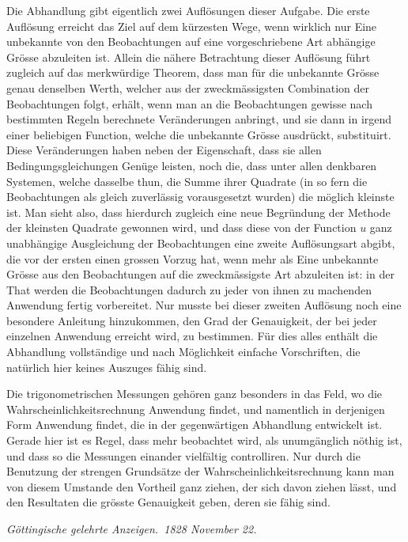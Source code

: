 \documentclass[12pt,a4paper]{article}
\begin{document}
Die Abhandlung gibt eigentlich zwei Aufl\"osungen dieser Aufgabe. Die erste Aufl\"osung erreicht das Ziel auf dem k\"urzesten Wege, wenn wirklich nur Eine unbekannte von den Beobachtungen auf eine vorgeschriebene Art abh\"angige Gr\"osse abzuleiten ist. Allein die n\"ahere Betrachtung dieser Aufl\"osung f\"uhrt zugleich auf das merkw\"urdige Theorem, dass man f\"ur die unbekannte Gr\"osse genau denselben Werth, welcher aus der zweckm\"assigsten Combination der Beobachtungen folgt, erh\"alt, wenn man an die Beobachtungen gewisse nach bestimmten Regeln berechnete Ver\"anderungen anbringt, und sie dann in irgend einer beliebigen Function, welche die unbekannte Gr\"osse ausdr\"uckt, substituirt. Diese Ver\"anderungen haben neben der Eigenschaft, dass sie allen Bedingungsgleichungen Gen\"uge leisten, noch die, dass unter allen denkbaren Systemen, welche dasselbe thun, die Summe ihrer Quadrate (in so fern die Beobachtungen als gleich zuverl\"assig vorausgesetzt wurden) die m\"oglich kleinste ist. Man sieht also, dass hierdurch zugleich eine neue Begr\"undung der Methode der kleinsten Quadrate gewonnen wird, und dass diese von der Function $u$ ganz unabh\"angige Ausgleichung der Beobachtungen eine zweite Aufl\"osungsart abgibt, die vor der ersten einen grossen Vorzug hat, wenn mehr als Eine unbekannte Gr\"osse aus den Beobachtungen auf die zweckm\"assigste Art abzuleiten ist: in der That werden die Beobachtungen dadurch zu jeder von ihnen zu machenden Anwendung fertig vorbereitet. Nur musste bei dieser zweiten Aufl\"osung noch eine besondere Anleitung hinzukommen, den Grad der Genauigkeit, der bei jeder einzelnen Anwendung erreicht wird, zu bestimmen. F\"ur dies alles enth\"alt die Abhandlung vollst\"andige und nach M\"oglichkeit einfache Vorschriften, die nat\"urlich hier keines Auszuges f\"ahig sind.

Die trigonometrischen Messungen geh\"oren ganz besonders in das Feld, wo die Wahrscheinlichkeitsrechnung Anwendung findet, und namentlich in derjenigen Form Anwendung findet, die in der gegenw\"artigen Abhandlung entwickelt ist. Gerade hier ist es Regel, dass mehr beobachtet wird, als unumg\"anglich n\"othig ist, und dass so die Messungen einander vielf\"altig controlliren. Nur durch die Benutzung der strengen Grunds\"atze der Wahrscheinlichkeitsrechnung kann man von diesem Umstande den Vortheil ganz ziehen, der sich davon ziehen l\"asst, und den Resultaten die gr\"osste Genauigkeit geben, deren sie f\"ahig sind.

\begin{flushright}
\textit{G\"ottingische gelehrte Anzeigen.\ 1828 November 22.}
\end{flushright}
\end{document}
